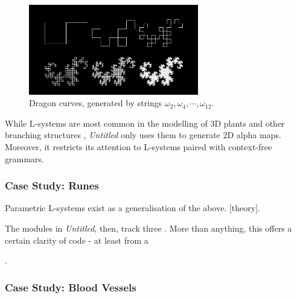 \documentclass[a4paper, 11pt]{article}
\begin{document}
\begin{flushleft}
\begin{figure}[h]
\centering
\includegraphics[width=0.66\textwidth]{Dragon Curves}
\caption{Dragon curves, generated by strings $\omega_2, \omega_4, \cdots, \omega_{12}$.}
\label{Dragon Curves}
\end{figure}

\vspace{5pt}\noindent
While L-systems are most common in the modelling of 3D plants and other branching structures \citep{prusinkiewiczAlgorithmicBeauty}, \textit{Untitled} only uses them to generate 2D alpha maps. Moreover, it restricts its attention to L-systems paired with context-free grammars.

\subsubsection{Case Study: Runes}

Parametric L-systems \citep{hananParametricLSystems} exist as a generalisation of the above. [theory].

\vspace{5pt}\noindent
The modules in \textit{Untitled}, then, track three . More than anything, this offers a certain clarity of code - at least from a 

\vspace{5pt}.

\subsubsection{Case Study: Blood Vessels} %


\end{flushleft}
\end{document}
